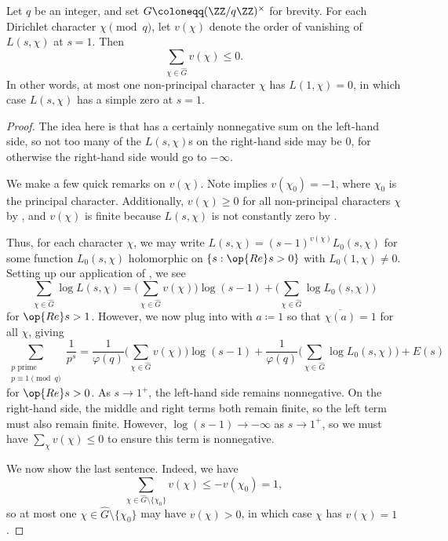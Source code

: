 \documentclass[../notes.tex]{subfiles}
\begin{document}
\begin{lemma} \label{lem:at-most-bad-chi}
	Let $q$ be an integer, and set $G\coloneqq(\ZZ/q\ZZ)^\times$ for brevity. For each Dirichlet character $\chi\pmod q$, let $v(\chi)$ denote the order of vanishing of $L(s,\chi)$ at $s=1$. Then
	\[\sum_{\chi\in\widehat G}v(\chi)\le0.\]
	In other words, at most one non-principal character $\chi$ has $L(1,\chi)=0$, in which case $L(s,\chi)$ has a simple zero at $s=1$.
\end{lemma}
\begin{proof}
	The idea here is that  has a certainly nonnegative sum on the left-hand side, so not too many of the $L(s,\chi)$s on the right-hand side may be $0$, for otherwise the right-hand side would go to $-\infty$.

	We make a few quick remarks on $v(\chi)$. Note  implies $v(\chi_0)=-1$, where $\chi_0$ is the principal character. Additionally, $v(\chi)\ge0$ for all non-principal characters $\chi$ by , and $v(\chi)$ is finite because $L(s,\chi)$ is not constantly zero by .

	Thus, for each character $\chi$, we may write $L(s,\chi)=(s-1)^{v(\chi)}L_0(s,\chi)$ for some function $L_0(s,\chi)$ holomorphic on $\{s:\op{Re}s>0\}$ with $L_0(1,\chi)\ne0$. Setting up our application of , we see
	\[\sum_{\chi\in\widehat G}\log L(s,\chi)=\Bigg(\sum_{\chi\in\widehat G}v(\chi)\Bigg)\log(s-1)+\Bigg(\sum_{\chi\in\widehat G}\log L_0(s,\chi)\Bigg)\]
	for $\op{Re}s>1$. However, we now plug into  with $a\coloneqq1$ so that $\overline{\chi(a)}=1$ for all $\chi$, giving
	\[\sum_{\substack{p\text{ prime}\\p\equiv1\pmod q}}\frac1{p^s}=\frac1{\varphi(q)}\Bigg(\sum_{\chi\in\widehat G}v(\chi)\Bigg)\log(s-1)+\frac1{\varphi(q)}\Bigg(\sum_{\chi\in\widehat G}\log L_0(s,\chi)\Bigg)+E(s)\]
	for $\op{Re}s>0$. As $s\to1^+$, the left-hand side remains nonnegative. On the right-hand side, the middle and right terms both remain finite, so the left term must also remain finite. However, $\log(s-1)\to-\infty$ as $s\to1^+$, so we must have $\sum_\chi v(\chi)\le0$ to ensure this term is nonnegative.

	We now show the last sentence. Indeed, we have
	\[\sum_{\chi\in\widehat G\setminus\{\chi_0\}}v(\chi)\le-v(\chi_0)=1,\]
	so at most one $\chi\in\widehat G\setminus\{\chi_0\}$ may have $v(\chi)>0$, in which case $\chi$ has $v(\chi)=1$.
\end{proof}
\end{document}
